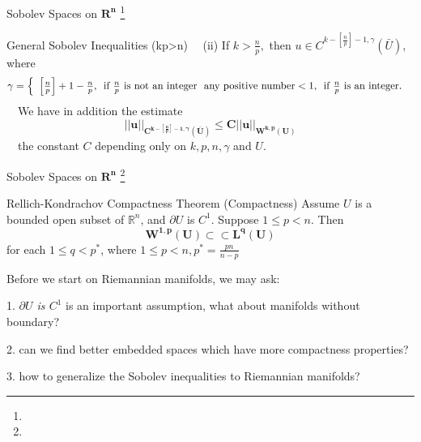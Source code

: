 \documentclass[xcolor=table,dvipsnames,svgnames,aspectratio=169,fontset=windows]{ctexbeamer}
\let\\\relax
\begin{document}
\begin{frame}{Sobolev Spaces on $\mathbf{R^n}$  \footnote{}}
  \begin{alertblock}{General Sobolev Inequalities (kp>n)}
  ~~(ii) If $k>\frac{n}{p},$ then $u \in C^{k-\left[\frac{n}{p}\right]-1, \gamma}(\bar{U})$, where
  $$
  \gamma=\left\{\begin{array}{l}
  {\left[\frac{n}{p}\right]+1-\frac{n}{p},\, \text { if } \frac{n}{p} \text { is not an integer }} \\
  \text { any positive number}<1,\, \text { if } \frac{n}{p} \text { is an integer. }
  \end{array}\right.
  $$
  ~~We have in addition the estimate
  $$
  \bm
  {||u||_{C^{k-\left[\frac{n}{p}\right]-1, \gamma}(\bar{U})} \leq C||u||_{W^{k, p}(U)}}
  $$
  ~~the constant $C$ depending only on $k, p, n, \gamma$ and $U$.
  \end{alertblock}
\end{frame}

\begin{frame}{Sobolev Spaces on $\mathbf{R^n}$  \footnote{}}
  \begin{alertblock}{Rellich-Kondrachov Compactness Theorem (Compactness)}
    Assume $U$ is a bounded open subset of $\mathbb{R}^n$, and $\partial U$ is $C^1$. Suppose $1 \leq p<n$. Then
    $$
    \bm
    {W^{1, p}(U) \subset \subset L^q(U)}
    $$
    for each $1 \leq q<p^*$, where $1 \leq p<n, p^*=\frac{p n}{n-p}$
    \end{alertblock}
    
    \vskip 5pt
    Before we start on Riemannian manifolds, we may ask:
    
    1. \textit{$\partial U$ is $C^1$} is an important assumption, what about manifolds without boundary?

    2. can we find better embedded spaces which have more compactness properties? 

    3. how to generalize the Sobolev inequalities to Riemannian manifolds?
  \end{frame}
\end{document}
